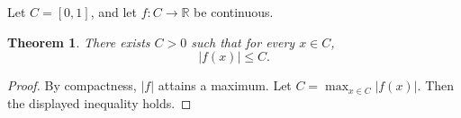 \documentclass{article}
\newtheorem{theorem}{Theorem}
\begin{document}
Let $C=[0,1]$, and let $f:C\to\mathbb R$ be continuous.

\begin{theorem}\label{thm:notation-collision}
There exists $C>0$ such that for every $x\in C$,
\[
  |f(x)|\le C.
\]
\end{theorem}
\begin{proof}
By compactness, $|f|$ attains a maximum. Let $C=\max_{x\in C}|f(x)|$.
Then the displayed inequality holds.
\end{proof}
\end{document}
